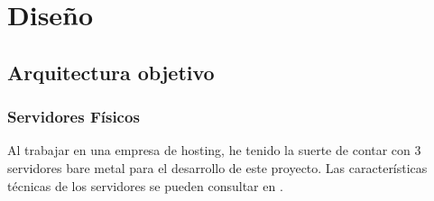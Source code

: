 \chapter {Diseño}

\section{Arquitectura objetivo}
\subsection{Servidores Físicos}
\begin{text}
	Al trabajar en una empresa de hosting, he tenido la suerte de contar con 3 servidores bare metal para el desarrollo de este proyecto. Las características técnicas de los servidores se pueden consultar en .
\end{text}

